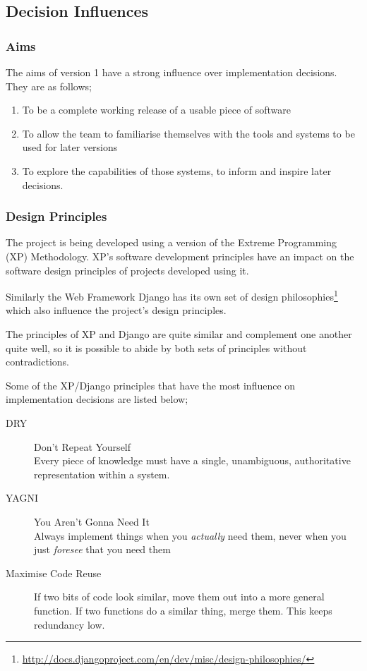 
\subsection{Decision Influences}

\subsubsection{Aims}

The aims of version 1 have a strong influence over implementation decisions. They are as follows;

\begin{enumerate}
\item To be a complete working release of a usable piece of software
\item To allow the team to familiarise themselves with the tools and systems to be used for later versions
\item To explore the capabilities of those systems, to inform and inspire later decisions.
\end{enumerate}


\subsubsection{Design Principles}

The project is being developed using a version of the Extreme Programming (XP) Methodology. XP's software development principles have an impact on the software design principles of projects developed using it.

Similarly the Web Framework Django has its own set of design philosophies\footnote{\url{http://docs.djangoproject.com/en/dev/misc/design-philosophies/}} which also influence the project's design principles.

The principles of XP and Django are quite similar and complement one another quite well, so it is possible to abide by both sets of principles without contradictions.

Some of the XP/Django principles that have the most influence on implementation decisions are listed below;

\begin{description}
\item[DRY] Don't Repeat Yourself \\
Every piece of knowledge must have a single, unambiguous, authoritative representation within a system.
\item[YAGNI] You Aren't Gonna Need It \\
Always implement things when you \textit{actually} need them, never when you just \textit{foresee} that you need them
\item[Maximise Code Reuse] If two bits of code look similar, move them out into a more general function. If two functions do a similar thing, merge them. This keeps redundancy low.
\end{description}

